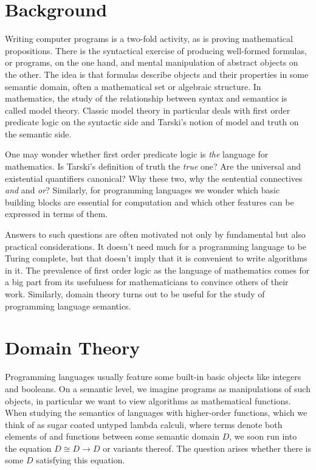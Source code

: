 \documentclass[a4paper]{article}
\newcommand{\arr}{\rightarrow}
\begin{document}
\section{Background}

Writing computer programs is a two-fold activity, as is proving mathematical
propositions. There is the syntactical exercise of producing well-formed
formulas, or programs, on the one hand, and mental manipulation of
abstract objects on the other. The idea is that formulas describe objects
and their properties in some semantic domain, often a mathematical set or
algebraic structure. In mathematics, the study of the relationship between
syntax and semantics is called model theory.  Classic model theory in particular
deals with first order predicate logic on the syntactic side and Tarski's notion
of model and truth on the semantic side.

One may wonder whether first order predicate logic is \emph{the} language for
mathematics. Is Tarski's definition of truth the \emph{true} one?  Are the
universal and existential quantifiers canonical? Why these two, why the
sentential connectives \emph{and} and \emph{or}? Similarly, for programming
languages we wonder which basic building blocks are essential for computation
and which other features can be expressed in terms of them.

Answers to such questions are often motivated not only by fundamental but also
practical considerations. It doesn't need much for a programming language to be
Turing complete, but that doesn't imply that it is convenient to write
algorithms in it. The prevalence of first order logic as the language of
mathematics comes for a big part from its usefulness for mathematicians to
convince others of their work. Similarly, domain theory turns out to be useful
for the study of programming language semantics.

\section{Domain Theory}

Programming languages usually feature some built-in basic objects like integers
and booleans. On a semantic level, we imagine programs as manipulations of such
objects, in particular we want to view algorithms as mathematical functions.
When studying the semantics of languages with higher-order functions,
which we think of as sugar coated untyped lambda calculi, where terms denote
both elements of and functions between some semantic domain $D$, we soon run
into the equation $D \cong D \arr D$ or variants thereof. The question
arises whether there is some $D$ satisfying this equation.
\end{document}
